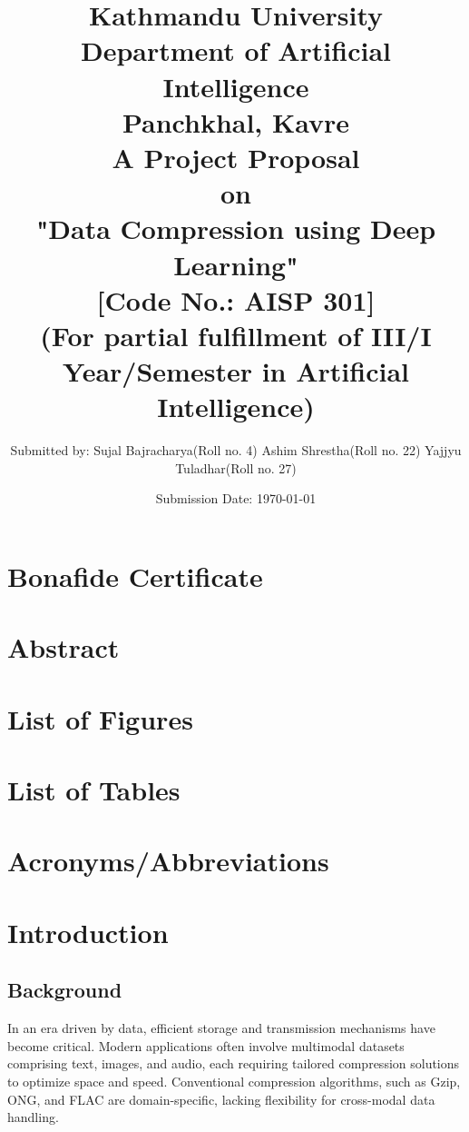 \documentclass[a4paper,12pt]{article}
\title{
\textbf{
    Kathmandu University \\
    \large{Department of Artificial Intelligence}\\
    \normalsize{Panchkhal, Kavre}\\[2cm]}
    \normalsize{A Project Proposal\\on\\
    \textbf{"Data Compression using Deep Learning"}}\\[0.5cm]
    \normalsize{[Code No.: AISP 301]\\
    (For partial fulfillment of III/I Year/Semester in Artificial Intelligence)}\\[1cm]
}
\author[ ]{\normalsize{
        Submitted by: \linebreak
        Sujal Bajracharya(Roll no. 4)\linebreak
        Ashim Shrestha(Roll no. 22)\linebreak
        Yajjyu Tuladhar(Roll no. 27)
}}
\affil[ ]{\vspace{0.3cm}}
\affil[ ]{\normalsize{
        Submitted to: \linebreak
        Subodh Acharya \linebreak
        Department of Artificial Intelligence
}}
\date{\normalsize{Submission Date: \today}}
\begin{document}
\maketitle
\thispagestyle{empty}
\restoregeometry

\newpage
\setcounter{page}{1}

\section*{Bonafide Certificate}
\newpage

\section*{Abstract}
\newpage

\tableofcontents
\newpage

\section*{List of Figures}
\newpage

\section*{List of Tables}
\newpage

\section*{Acronyms/Abbreviations}
\newpage

\setcounter{page}{1}

\section{Introduction}
\subsection{Background}
In an era driven by data, efficient storage and transmission mechanisms have become critical. Modern applications often involve multimodal datasets comprising text, images, and audio, each requiring tailored compression solutions to optimize space and speed. Conventional compression algorithms, such as Gzip, ONG, and FLAC are domain-specific, lacking flexibility for cross-modal data handling. 
\end{document}
